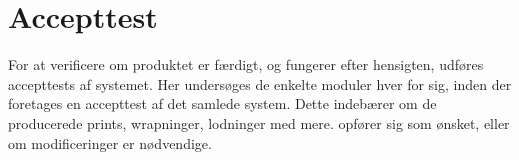 \chapter{Accepttest}
\label{SystemSammenSaetningOgAccepttest}
For at verificere om produktet er færdigt, og fungerer efter hensigten, udføres accepttests af systemet. Her undersøges de enkelte moduler hver for sig, inden der foretages en accepttest af det samlede system. Dette indebærer om de producerede prints, wrapninger, lodninger med mere. opfører sig som ønsket, eller om modificeringer er nødvendige.





%
%